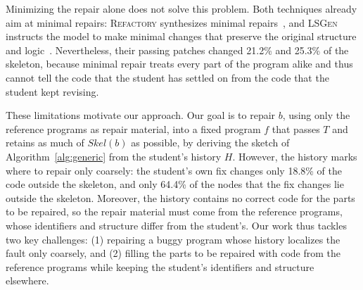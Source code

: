 \documentclass[10pt,conference]{IEEEtran}
\begin{document}
Minimizing the repair alone does not solve this problem. Both techniques already aim at minimal repairs: \textsc{Refactory} synthesizes minimal repairs~\cite{hu2019re}, and \textsc{LSGen} instructs the model to make minimal changes that preserve the original structure and logic~\cite{dai2026learner}. Nevertheless, their passing patches changed 21.2\% and 25.3\% of the skeleton, because minimal repair treats every part of the program alike and thus cannot tell the code that the student has settled on from the code that the student kept revising.

These limitations motivate our approach. Our goal is to repair $b$, using only the reference programs as repair material, into a fixed program $f$ that passes $T$ and retains as much of $\mathit{Skel}(b)$ as possible, by deriving the sketch of Algorithm~\ref{alg:generic} from the student's history $H$. However, the history marks where to repair only coarsely: the student's own fix changes only 18.8\% of the code outside the skeleton, and only 64.4\% of the nodes that the fix changes lie outside the skeleton. Moreover, the history contains no correct code for the parts to be repaired, so the repair material must come from the reference programs, whose identifiers and structure differ from the student's. Our work thus tackles two key challenges: (1) repairing a buggy program whose history localizes the fault only coarsely, and (2) filling the parts to be repaired with code from the reference programs while keeping the student's identifiers and structure elsewhere.
\end{document}
